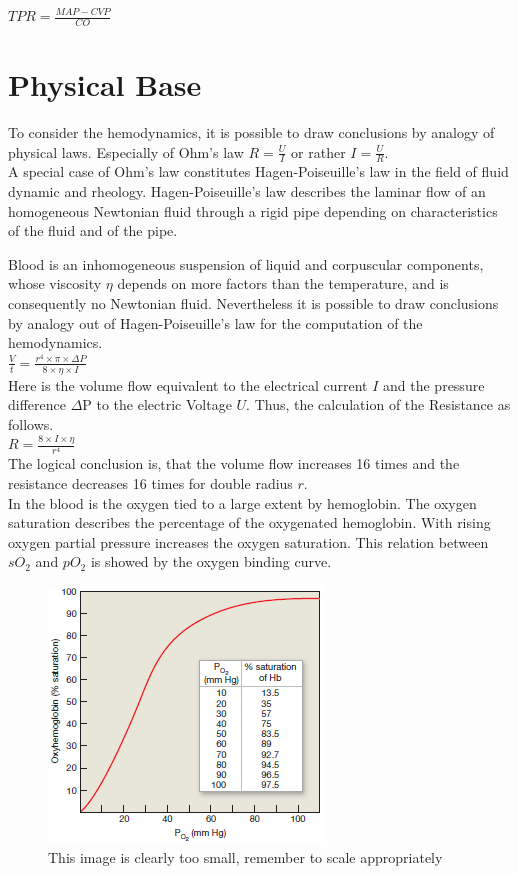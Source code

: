 $ TPR=\frac{MAP-CVP}{CO} $

\section{Physical Base}
To consider the hemodynamics, it is possible to draw conclusions by analogy of physical laws. Especially of Ohm's law $ R=\frac{U}{I} $ or rather $ I=\frac{U}{R} $.\\

A special case of Ohm's law constitutes Hagen-Poiseuille's law in the field of fluid dynamic and rheology. Hagen-Poiseuille's law describes the laminar flow of an homogeneous Newtonian fluid through a rigid pipe depending on characteristics of the fluid and of the pipe.

Blood is an inhomogeneous suspension of liquid and corpuscular components, whose viscosity $ \eta $ depends on more factors than the temperature, and is consequently no Newtonian fluid. Nevertheless it is possible to draw conclusions by analogy out of Hagen-Poiseuille's law for the computation of the hemodynamics.\\

$ \frac{V}{t}=\frac{r^{4}\times\pi\times\Delta P}{8\times\eta\times I} $\\

Here is the volume flow equivalent to the electrical current $ I $ and the pressure difference $ \Delta $P to the electric Voltage $ U $. Thus, the calculation of the Resistance as follows.\\

$ R=\frac{8\times I\times\eta}{r^{4}} $\\

The logical conclusion is, that the volume flow increases 16 times and the resistance decreases 16 times for double radius $ r $.\\

In the blood is the oxygen tied to a large extent by hemoglobin. The oxygen saturation describes the percentage of the oxygenated hemoglobin. With rising oxygen partial pressure increases the oxygen saturation. This relation between $ sO_{2} $ and $ pO_{2} $ is showed by the oxygen binding curve.

\begin{figure}[H]                                         %
	\includegraphics[width=.4\textwidth]{figures/oxygen_saturation_curve.png}  %
	\caption{This image is clearly too small, remember to scale appropriately }
	\label{fig:FigureLABEL}  %
\end{figure}

